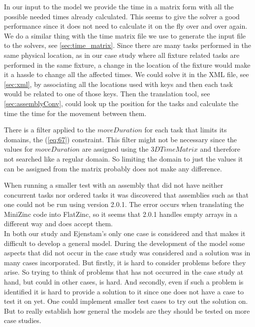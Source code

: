 In our input to the model we provide the time in a matrix form with all the possible needed times already calculated. This seems to give the solver a good performance since it does not need to calculate it on the fly over and over again. We do a similar thing with the time matrix file we use to generate the input file to the solvers, see \ref{sec:time_matrix}. Since there are many tasks performed in the same physical location, as in our case study where all fixture related tasks are performed in the same fixture, a change in the location of the fixture would make it a hassle to change all the affected times. We could solve it in the XML file, see \ref{sec:xml}, by associating all the locations used with keys and then each task would be related to one of those keys. Then the translation tool, see \ref{sec:assemblyConv}, could look up the position for the tasks and calculate the time the time for the movement between them.

There is a filter applied to the $moveDuration$ for each task that limits its domains, the (\ref{eq:67}) constraint. This filter might not be necessary since the values for $moveDuration$ are assigned using the $3DTimeMatrix$ and therefore not searched like a regular domain. So limiting the domain to just the values it can be assigned from the matrix probably does not make any difference.

When running a smaller test with an assembly that did not have neither concurrent tasks nor ordered tasks it was discovered that assemblies such as that one could not be run using version 2.0.1. The error occurs when translating the MiniZinc code into FlatZinc, so it seems that 2.0.1 handles empty arrays in a different way and does accept them.
\\
In both our study and Ejenstam's only one case is considered and that makes it difficult to develop a general model. During the development of the model some aspects that did not occur in the case study was considered and a solution was in many cases incorporated. But firstly, it is hard to consider problems before they arise. So trying to think of problems that has not occurred in the case study at hand, but could in other cases, is hard. And secondly, even if such a problem is identified it is hard to provide a solution to it since one does not have a case to test it on yet. One could implement smaller test cases to try out the solution on. But to really establish how general the models are they should be tested on more case studies.
\newpage
